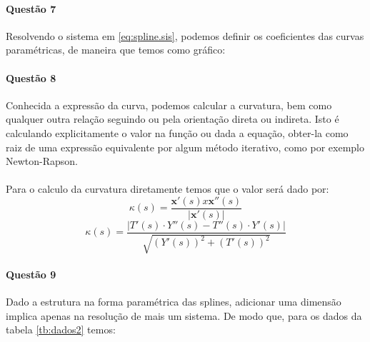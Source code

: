 \documentclass[a4paper,11pt]{article}
\begin{document}
\paragraph{Questão 7}Resolvendo o sistema em \ref{eq:spline.sis}, podemos definir os coeficientes das curvas paramétricas, de maneira que temos como gráfico:


\paragraph{Questão 8}Conhecida a expressão da curva, podemos calcular a curvatura, bem como qualquer outra relação seguindo ou pela orientação direta ou indireta. Isto é calculando explicitamente o valor na função ou dada a equação, obter-la como raiz de uma expressão equivalente por algum método iterativo, como por exemplo Newton-Rapson.
\paragraph{}Para o calculo da curvatura diretamente temos que o valor será dado por:
\begin{equation}\label{eq:spline.curvatura}
\kappa(s)=\frac{\textbf{x}'(s)x\textbf{x}''(s)}{|\textbf{x}'(s)|}
\end{equation}
\begin{equation}
\kappa(s)=\frac{|T'(s)\cdot Y''(s)-T''(s)\cdot Y'(s)|}{\sqrt{(Y'(s))^2 + (T'(s))^2}}
\end{equation}

\paragraph{Questão 9}Dado a estrutura na forma paramétrica das splines, adicionar uma dimensão implica apenas na resolução de mais um sistema. De modo que, para os dados da tabela \ref{tb:dados2} temos:


\end{document}
